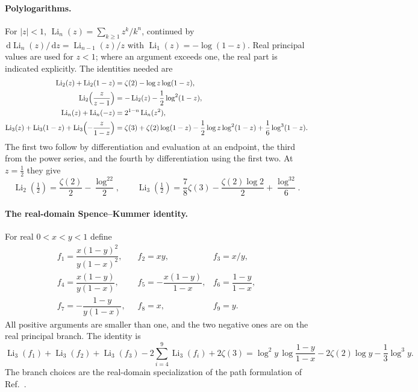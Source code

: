 \documentclass[11pt,a4paper]{article}
\numberwithin{equation}{section}
\newcommand{\dd}{\,\mathrm d}
\newcommand{\Li}{\operatorname{Li}}
\begin{document}
\paragraph{Polylogarithms.} For $|z|<1$, $\Li_n(z)=\sum_{k\ge1}z^k/k^n$, continued by
$\dd\Li_n(z)/\dd z=\Li_{n-1}(z)/z$ with $\Li_1(z)=-\log(1-z)$. Real principal values are used for $z<1$; where an
argument exceeds one, the real part is indicated explicitly. The identities needed are
\begin{align}
 \Li_2(z)+\Li_2(1-z)&=\zeta(2)-\log z\log(1-z),\label{eq:dualB:Euler}\\
 \Li_2\Bigl(\frac{z}{z-1}\Bigr)&=-\Li_2(z)-\frac12\log^2(1-z),\label{eq:dualB:Li2Landen}\\
 \Li_n(z)+\Li_n(-z)&=2^{1-n}\Li_n(z^2),\label{eq:dualB:dup}\\
 \Li_3(z)+\Li_3(1-z)+\Li_3\Bigl(-\frac z{1-z}\Bigr)&=\zeta(3)+\zeta(2)\log(1-z)-\frac12\log z\log^2(1-z)
 +\frac16\log^3(1-z).\label{eq:dualB:Li3Landen}
\end{align}
The first two follow by differentiation and evaluation at an endpoint, the third from the power series, and the
fourth by differentiation using the first two. At $z=\frac12$ they give
\begin{equation}
 \Li_2(\tfrac12)=\frac{\zeta(2)}{2}-\frac{\log^22}{2},\qquad
 \Li_3(\tfrac12)=\frac78\zeta(3)-\frac{\zeta(2)\log2}{2}+\frac{\log^32}{6}.
 \label{eq:dualB:halfvalues}
\end{equation}

\paragraph{The real-domain Spence--Kummer identity.} For real $0<x<y<1$ define
\begin{equation}
\begin{array}{lll}
 f_1=\dfrac{x(1-y)^2}{y(1-x)^2},\quad & f_2=xy,\quad & f_3=x/y,\\[3mm]
 f_4=\dfrac{x(1-y)}{y(1-x)}, & f_5=-\dfrac{x(1-y)}{1-x}, & f_6=\dfrac{1-y}{1-x},\\[3mm]
 f_7=-\dfrac{1-y}{y(1-x)}, & f_8=x, & f_9=y.
\end{array}
\end{equation}
All positive arguments are smaller than one, and the two negative ones are on the real principal branch. The identity
is
\begin{equation}
 \Li_3(f_1)+\Li_3(f_2)+\Li_3(f_3)-2\sum_{i=4}^{9}\Li_3(f_i)+2\zeta(3)
 =\log^2y\,\log\frac{1-y}{1-x}-2\zeta(2)\log y-\frac13\log^3y.
 \label{eq:dualB:Kummerfull}
\end{equation}
The branch choices are the real-domain specialization of the path formulation of Ref.~\cite{Shiraishi:2023}.
\end{document}
